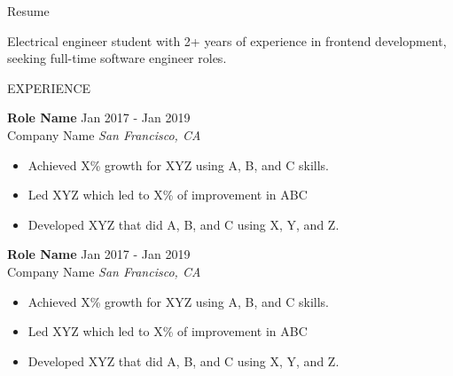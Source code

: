 \documentclass{resume} %
\begin{document}

\begin{rSection}{Resume}

    {Electrical engineer student with 2+ years of experience in frontend development, seeking full-time software engineer roles.}


\end{rSection}



\begin{rSection}{EXPERIENCE}

    \textbf{Role Name} \hfill Jan 2017 - Jan 2019\\
    Company Name \hfill \textit{San Francisco, CA}
     \begin{itemize}
        \itemsep -3pt {}
         \item Achieved X\% growth for XYZ using A, B, and C skills.
         \item Led XYZ which led to X\% of improvement in ABC
        \item Developed XYZ that did A, B, and C using X, Y, and Z.
     \end{itemize}

    \textbf{Role Name} \hfill Jan 2017 - Jan 2019\\
    Company Name \hfill \textit{San Francisco, CA}
     \begin{itemize}
        \itemsep -3pt {}
         \item Achieved X\% growth for XYZ using A, B, and C skills.
         \item Led XYZ which led to X\% of improvement in ABC
        \item Developed XYZ that did A, B, and C using X, Y, and Z.
     \end{itemize}

\end{rSection}

\end{document}

